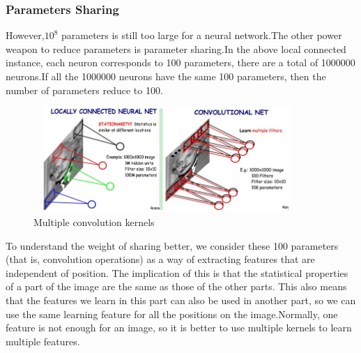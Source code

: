 \documentclass[12pt,a4paper]{report}
\begin{document}
\subsubsection{Parameters Sharing}
However,$10^8$ parameters is still too large for a neural network.\cite{cnn1}The other power weapon to reduce parameters is parameter sharing.In the above local connected instance, each neuron corresponds to 100 parameters, there are a total of 1000000 neurons.If  all the 1000000 neurons have the same 100 parameters, then the number of parameters reduce to 100.\\
\begin{figure}[h]
\centering
\includegraphics[height=4cm,width=0.9\textwidth]{parameter.png}
\caption{Multiple convolution kernels\cite{cnn2}}
\end{figure}
To understand the weight of sharing better, we consider these 100 parameters (that is, convolution operations) as a way of extracting features that are independent of position. The implication of this is that the statistical properties of a part of the image are the same as those of the other parts. This also means that the features we learn in this part can also be used in another part, so we can use the same learning feature for all the positions on the image.Normally, one feature is not enough for an image, so it is better to use multiple kernels to learn multiple features.
\end{document}

